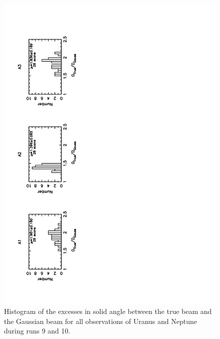 \begin{figure}
\begin{center}
  \includegraphics[clip, angle=-90, scale=0.6]{Figures/TG_hist_Ura_Nep_run9_28scan.pdf}
  \caption{Histogram of the excesses in solid angle between the true beam and the Gaussian beam for all
   observations of Uranus and Neptune during runs 9 and 10.}
\label{hist:excesses}
\end{center}
\end{figure}


